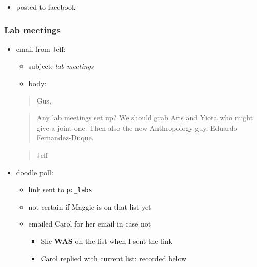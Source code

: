 \documentclass[letterpaper]{scrartcl}
\begin{document}
\begin{itemize}
\itemsep1pt\parskip0pt
\item
  posted to facebook
\end{itemize}

\subsubsection{Lab meetings}\label{lab-meetings}

\begin{itemize}
\itemsep1pt\parskip0pt
\item
  email from Jeff:

  \begin{itemize}
  \itemsep1pt\parskip0pt
  \item
    subject: \emph{lab meetings}
  \item
    body:
  \end{itemize}

  \begin{quote}
  Gus,
  \end{quote}

  \begin{quote}
  Any lab meetings set up? We should grab Aris and Yiota who might give
  a joint one. Then also the new Anthropology guy, Eduardo
  Fernandez-Duque.
  \end{quote}

  \begin{quote}
  Jeff
  \end{quote}
\item
  doodle poll:

  \begin{itemize}
  \itemsep1pt\parskip0pt
  \item
    \href{http://doodle.com/hc4r8gdi6wnse425}{link} sent to
    \texttt{pc\_labs}
  \item
    not certain if Maggie is on that list yet
  \item
    emailed Carol for her email in case not

    \begin{itemize}
    \itemsep1pt\parskip0pt
    \item
      She \textbf{WAS} on the list when I sent the link
    \item
      Carol replied with current list: recorded below
    \end{itemize}
  \end{itemize}
\end{itemize}
\end{document}
